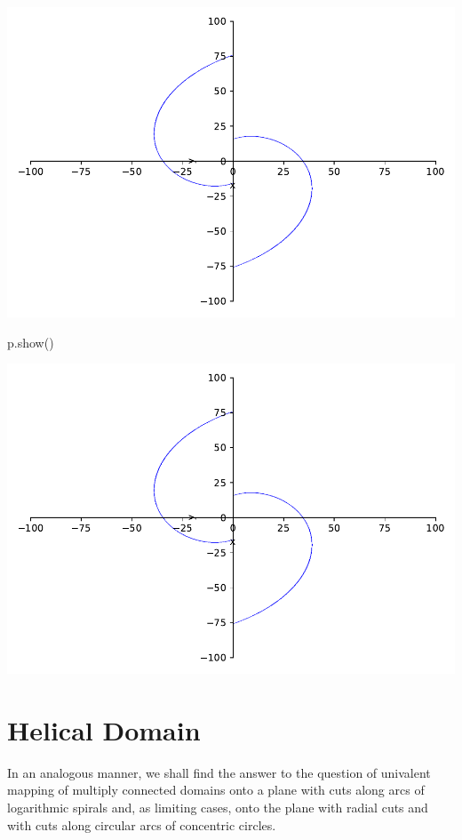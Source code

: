 \documentclass[
]{book}
\newenvironment{Shaded}{\begin{snugshade}}{\end{snugshade}}
\newcommand{\NormalTok}[1]{#1}
\theoremstyle{definition}
\theoremstyle{definition}
\theoremstyle{definition}
\theoremstyle{definition}
\theoremstyle{remark}
\begin{document}
\includegraphics{ConformalMapping_files/figure-latex/unnamed-chunk-62-11.pdf}

\begin{Shaded}
\begin{Highlighting}[]
\NormalTok{p.show()}
\end{Highlighting}
\end{Shaded}

\includegraphics{ConformalMapping_files/figure-latex/unnamed-chunk-62-12.pdf}

\chapter{Helical Domain}\label{helical-domain-1}

In an analogous manner, we shall find the answer to the question of univalent mapping of multiply connected domains onto a plane with cuts along arcs of logarithmic spirals and, as limiting cases, onto the plane with radial cuts and with cuts along circular arcs of concentric circles.
\end{document}
